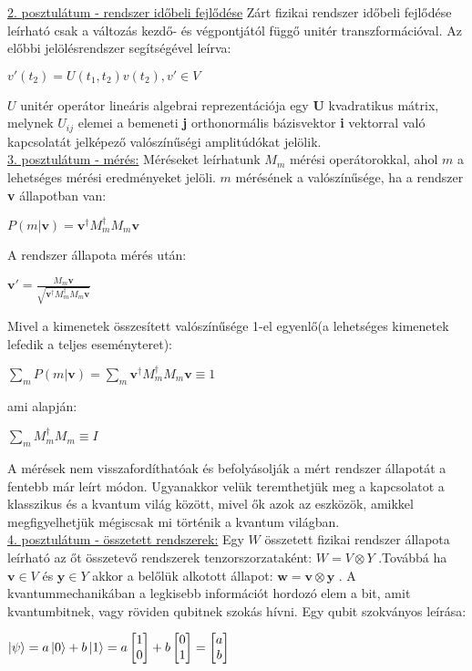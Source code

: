 \underline{2. posztulátum - rendszer időbeli fejlődése} Zárt fizikai rendszer időbeli fejlődése leírható csak a változás kezdő- és végpontjától függő unitér transzformációval. Az előbbi jelölésrendszer segítségével leírva: 
\begin{center}
$v'(t_2) = U(t_1,t_2)v(t_2), v' \in V$
\end{center}
$ U $ unitér operátor lineáris algebrai reprezentációja egy \textbf{U} kvadratikus mátrix, melynek $U_{ij}$ elemei a bemeneti \textbf{j} orthonormális bázisvektor \textbf{i} vektorral való kapcsolatát jelképező valószínűségi amplitúdókat jelölik.\\

\underline{3. posztulátum - mérés:} Méréseket leírhatunk $M_m$  mérési operátorokkal, ahol $m$ a lehetséges mérési eredményeket jelöli. $m$ mérésének a valószínűsége, ha a rendszer \textbf{v} állapotban van:
\begin{center}
$P(m|\textbf{v})= {\textbf{v}}^\dagger M_m^\dagger M_m \textbf{v} $
\end{center}
A rendszer állapota mérés után:
\begin{center}
$ {\textbf{v}}' = \frac{M_m \textbf{v}}{\sqrt{{\textbf{v}}^\dagger M_m^\dagger M_m \textbf{v}}}  $
\end{center}
Mivel a kimenetek összesített valószínűsége 1-el egyenlő(a lehetséges kimenetek lefedik a teljes eseményteret):
\begin{center}
$ \sum_m P(m|\textbf{v}) = \sum_m {\textbf{v}}^\dagger M_m^\dagger M_m \textbf{v} \equiv 1$
\end{center}
ami alapján:
\begin{center}
$\sum_m M_m^\dagger M_m \equiv I $
\end{center}
A mérések nem visszafordíthatóak és befolyásolják a mért rendszer állapotát a fentebb már leírt módon. Ugyanakkor velük teremthetjük meg a kapcsolatot a klasszikus és a kvantum világ között, mivel ők azok az eszközök,  amikkel megfigyelhetjük mégiscsak mi történik a kvantum világban.
\\
\underline{4. posztulátum - összetett rendszerek:}
Egy $ W $ összetett fizikai rendszer állapota leírható az őt összetevő rendszerek tenzorszorzataként:
$ W=V \otimes Y $ .Továbbá ha $\textbf{v} \in V  $  és  $ \textbf{y} \in Y $ akkor a belőlük alkotott állapot: $ \textbf{w}=\textbf{v}\otimes \textbf{y} $ .
A kvantummechanikában a legkisebb információt hordozó elem a bit, amit kvantumbitnek, vagy röviden qubitnek  szokás hívni. Egy qubit szokványos leírása:
\begin{center}
$ \ket{\psi}=a\ket{0}+b\ket{1}=a \begin{bmatrix}1\\0\end{bmatrix}+ b \begin{bmatrix}0\\1\end{bmatrix} = \begin{bmatrix} a\\b \end{bmatrix} $
\end{center}
